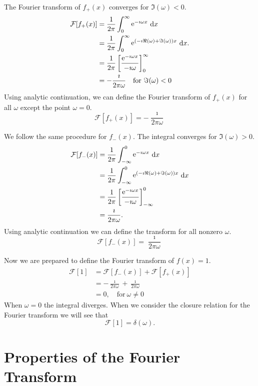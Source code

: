 The Fourier transform of $f_+(x)$ converges for $\Im(\omega) < 0$.
\begin{align*}
  \mathcal{F}[f_+(x)]
  &= \frac{1}{2\pi} \int_0^\infty \mathop{\mathrm{e}}\nolimits^{-\imath \omega x}\,\mathrm{d} x 
  \\
  &= \frac{1}{2\pi} \int_0^\infty \mathop{\mathrm{e}}\nolimits^{(-\imath \Re(\omega) + \Im(\omega))x} \,\mathrm{d} x. 
  \\
  &= \frac{1}{2\pi} \left[ \frac{\mathop{\mathrm{e}}\nolimits^{-\imath \omega x}}{-\imath \omega} \right]_0^\infty 
  \\
  &= -\frac{\imath}{2 \pi \omega} \quad \mathrm{for}\ \Im(\omega) < 0
\end{align*}
Using analytic continuation, we can define the Fourier transform of $f_+(x)$
for all $\omega$ except the point $\omega = 0$.
\[ 
\mathcal{F}[f_+(x)] = -\frac{\imath}{2\pi\omega}
\]


We follow the same procedure for $f_-(x)$.
The integral converges for $\Im(\omega) > 0$.
\begin{align*}
  \mathcal{F}[f_-(x)]
  &= \frac{1}{2\pi} \int_{-\infty}^0 \mathop{\mathrm{e}}\nolimits^{-\imath \omega x}\,\mathrm{d} x 
  \\
  &= \frac{1}{2\pi} \int_{-\infty}^0 \mathop{\mathrm{e}}\nolimits^{(-\imath \Re(\omega) + \Im(\omega))x} \,\mathrm{d} x
  \\
  &= \frac{1}{2\pi} \left[ \frac{\mathop{\mathrm{e}}\nolimits^{-\imath \omega x}}{-\imath \omega} \right]_{-\infty}^0 
  \\
  &= \frac{\imath}{2 \pi \omega}.
\end{align*}
Using analytic continuation we can define the transform for all nonzero 
$\omega$.
\[ 
\mathcal{F}[f_-(x)] = \frac{\imath}{2 \pi \omega}
\]

Now we are prepared to define the Fourier transform of $f(x) = 1$.
\begin{align*}
  \mathcal{F}[1]
  &= \mathcal{F}[f_-(x)] + \mathcal{F}[f_+(x)] 
  \\
  &= -\frac{\imath}{2\pi\omega} + \frac{\imath}{2 \pi \omega} 
  \\
  &= 0 , \quad \mathrm{for}\ \omega \neq 0
\end{align*}
When $\omega = 0$ the integral diverges.  When we consider the 
closure relation for the Fourier transform we will see that
\[ 
\boxed{ 
  \mathcal{F}[1] = \delta(\omega). 
  } 
\]








\section{Properties of the Fourier Transform}


